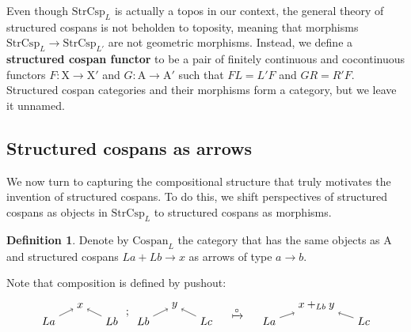 \documentclass{amsart}
\newcommand{\A}{\cat{A}}
\newcommand{\X}{\cat{X}}
\newcommand{\Csp}{\cat{Cospan}}
\newcommand{\StrCsp}{\cat{StrCsp}}
\newcommand{\defn}[1]{\textbf{#1}}
\newcommand{\cat}[1]{\mathrm{#1}}
\newcommand{\from}{\colon}
\newcommand{\csp}[3]{#1 + #3 \to #2}
\theoremstyle{remark}
\theoremstyle{definition}
\newtheorem{definition}[theorem]{Definition}
\begin{document}
Even though $ \StrCsp_L $ is actually a topos in our context, the
general theory of structured cospans is not beholden to toposity,
meaning that morphisms $ \StrCsp_L \to \StrCsp_{L'} $ are not
geometric morphisms. Instead, we define a \defn{structured cospan
  functor} to be a pair of finitely continuous and cocontinuous
functors $ F \from \X \to \X' $ and $ G \from \A \to \A' $ such that
$ FL=L'F $ and $ GR = R'F $.  Structured cospan categories and their
morphisms form a category, but we leave it unnamed.


\subsection{Structured cospans as arrows}
\label{sec:StrCsp-as-Arrows}

We now turn to capturing the compositional structure that
truly motivates the invention of structured cospans.  To do this, we
shift perspectives of structured cospans as objects in $ \StrCsp_{L} $
to structured cospans as morphisms. 

\begin{definition}
\label{def:strcsp-arr}  
  Denote by $ \Csp_{L} $ the category that has the same objects as
  $ \A $ and structured cospans $ \csp{La}{x}{Lb} $ as arrows of
  type $ a \to b $.
\end{definition}

Note that composition is defined by pushout:
%
\[
  \begin{tikzpicture}
    \begin{scope}
    \node (1) at (0,0) {\( La \)};
    \node (2) at (1,0.5) {\( x \)};
    \node (3) at (2,0) {\( Lb \)};
    \node (4) at (3,0) {\( Lb \)};
    \node (5) at (4,0.5) {\( y \)};
    \node (6) at (5,0) {\( Lc \)};
    \node (7) at (2.5,0.25) {\( ; \)};
    \draw [->] (1) to node [] {\scriptsize{\(  \)}} (2);
    \draw [->] (3) to node [] {\scriptsize{\(  \)}} (2);
    \draw [->] (4) to node [] {\scriptsize{\(  \)}} (5);
    \draw [->] (6) to node [] {\scriptsize{\(  \)}} (5);
    \end{scope}
    \begin{scope}[shift={(6,0)}]
    \node (1) at (0,0.25) {\( \xmapsto{\circ} \)};
    \end{scope}
    \begin{scope}[shift={(7,0)}]
    \node (1) at (0,0) {\( La \)};
    \node (2) at (1.5,0.5) {\( x +_{Lb} y \)};
    \node (3) at (3,0) {\( Lc \)};
     \draw [->] (1) to node [] {\scriptsize{\(  \)}} (2);
    \draw [->] (3) to node [] {\scriptsize{\(  \)}} (2); 
    \end{scope}
  \end{tikzpicture}
\]
% 
\end{document}
